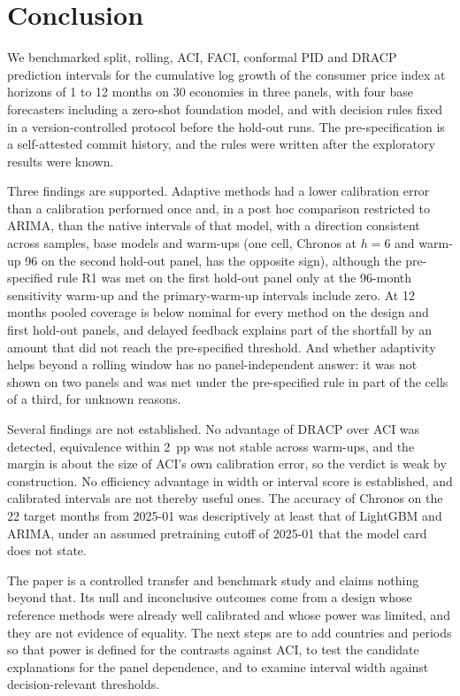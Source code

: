 \section{Conclusion}\label{sec:conclusion}

We benchmarked split, rolling, ACI, FACI, conformal PID and DRACP prediction intervals for the cumulative log growth of the consumer price index at horizons of 1 to 12 months on 30 economies in three panels, with four base forecasters including a zero-shot foundation model, and with decision rules fixed in a version-controlled protocol before the hold-out runs. The pre-specification is a self-attested commit history, and the rules were written after the exploratory results were known.

Three findings are supported. Adaptive methods had a lower calibration error than a calibration performed once and, in a post hoc comparison restricted to ARIMA, than the native intervals of that model, with a direction consistent across samples, base models and warm-ups (one cell, Chronos at $h=6$ and warm-up 96 on the second hold-out panel, has the opposite sign), although the pre-specified rule R1 was met on the first hold-out panel only at the 96-month sensitivity warm-up and the primary-warm-up intervals include zero. At 12 months pooled coverage is below nominal for every method on the design and first hold-out panels, and delayed feedback explains part of the shortfall by an amount that did not reach the pre-specified threshold. And whether adaptivity helps beyond a rolling window has no panel-independent answer: it was not shown on two panels and was met under the pre-specified rule in part of the cells of a third, for unknown reasons.

Several findings are not established. No advantage of DRACP over ACI was detected, equivalence within 2~pp was not stable across warm-ups, and the margin is about the size of ACI's own calibration error, so the verdict is weak by construction. No efficiency advantage in width or interval score is established, and calibrated intervals are not thereby useful ones. The accuracy of Chronos on the 22 target months from 2025-01 was descriptively at least that of LightGBM and ARIMA, under an assumed pretraining cutoff of 2025-01 that the model card does not state. \ExplainerStatus{}

The paper is a controlled transfer and benchmark study and claims nothing beyond that. Its null and inconclusive outcomes come from a design whose reference methods were already well calibrated and whose power was limited, and they are not evidence of equality. The next steps are to add countries and periods so that power is defined for the contrasts against ACI, to test the candidate explanations for the panel dependence, and to examine interval width against decision-relevant thresholds.
